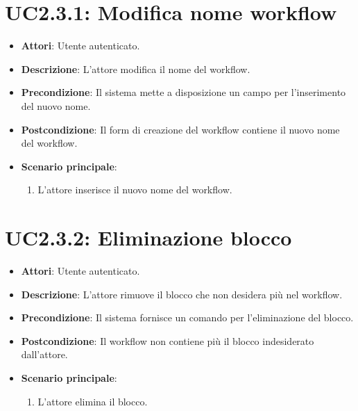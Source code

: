 \section{UC2.3.1: Modifica nome workflow}
\label{UC2.3.1}
\begin{itemize}
	\item \textbf{Attori}: Utente autenticato.
	\item \textbf{Descrizione}: L'attore modifica il nome del workflow.
	\item \textbf{Precondizione}: Il sistema mette a disposizione un campo per l'inserimento del nuovo nome.
	\item \textbf{Postcondizione}: Il form di creazione del workflow contiene il nuovo nome del workflow.
	\item \textbf{Scenario principale}:
	\begin{enumerate} \item L'attore inserisce il nuovo nome del workflow.\end{enumerate}
\end{itemize}

\section{UC2.3.2: Eliminazione blocco}
\label{UC2.3.2}
\begin{itemize}
	\item \textbf{Attori}: Utente autenticato.
	\item \textbf{Descrizione}: L'attore rimuove il blocco che non desidera più nel workflow.
	\item \textbf{Precondizione}: Il sistema fornisce un comando per l'eliminazione del blocco.
	\item \textbf{Postcondizione}: Il workflow non contiene più il blocco indesiderato dall'attore.
	\item \textbf{Scenario principale}:
	\begin{enumerate} \item L'attore elimina il blocco.\end{enumerate}
\end{itemize}

